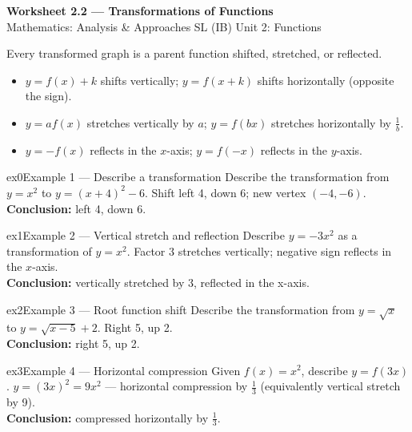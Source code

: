 \documentclass[11pt]{article}
\begin{document}
\begin{center}
{\LARGE\bfseries\color{titleblue}Worksheet 2.2 --- Transformations of Functions}\\[2pt]
{\small Mathematics: Analysis \& Approaches SL (IB) \textperiodcentered{} Unit 2: Functions}
\end{center}

\begin{ideabox}
Every transformed graph is a parent function shifted, stretched, or reflected.
\begin{itemize}[leftmargin=*,itemsep=2pt]
  \item $y=f(x)+k$ shifts vertically; $y=f(x+k)$ shifts horizontally (opposite the sign).
  \item $y=af(x)$ stretches vertically by $a$; $y=f(bx)$ stretches horizontally by $\tfrac1b$.
  \item $y=-f(x)$ reflects in the $x$-axis; $y=f(-x)$ reflects in the $y$-axis.
\end{itemize}
\end{ideabox}


\begin{example}{ex0}{Example 1 --- Describe a transformation}
Describe the transformation from $y=x^2$ to $y=(x+4)^2-6$.\soln
Shift left 4, down 6; new vertex $(-4,-6)$.\\[3pt]\textbf{Conclusion:} left 4, down 6.
\end{example}

\begin{example}{ex1}{Example 2 --- Vertical stretch and reflection}
Describe $y=-3x^2$ as a transformation of $y=x^2$.\soln
Factor $3$ stretches vertically; negative sign reflects in the $x$-axis.\\[3pt]\textbf{Conclusion:} vertically stretched by 3, reflected in the x-axis.
\end{example}

\begin{example}{ex2}{Example 3 --- Root function shift}
Describe the transformation from $y=\sqrt x$ to $y=\sqrt{x-5}+2$.\soln
Right 5, up 2.\\[3pt]\textbf{Conclusion:} right 5, up 2.
\end{example}

\begin{example}{ex3}{Example 4 --- Horizontal compression}
Given $f(x)=x^2$, describe $y=f(3x)$.\soln
$y=(3x)^2=9x^2$ --- horizontal compression by $\tfrac13$ (equivalently vertical stretch by 9).\\[3pt]\textbf{Conclusion:} compressed horizontally by $\tfrac13$.
\end{example}
\end{document}
